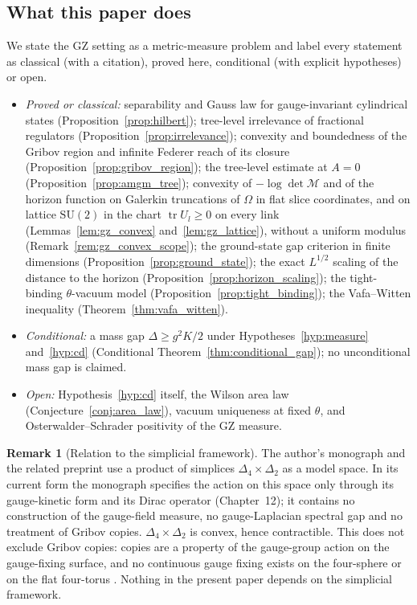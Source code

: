 \documentclass[11pt,a4paper]{amsart}
\theoremstyle{definition}
\newtheorem{remark}[theorem]{Remark}
\begin{document}
\subsection*{What this paper does}
We state the GZ setting as a metric-measure problem and label every statement as classical (with a citation), proved here, conditional (with explicit hypotheses) or open.
\begin{itemize}
    \item \emph{Proved or classical:} separability and Gauss law for gauge-invariant cylindrical states (Proposition~\ref{prop:hilbert}); tree-level irrelevance of fractional regulators (Proposition~\ref{prop:irrelevance}); convexity and boundedness of the Gribov region and infinite Federer reach of its closure (Proposition~\ref{prop:gribov_region}); the tree-level estimate at $A = 0$ (Proposition~\ref{prop:amgm_tree}); convexity of $-\log\det\mathcal{M}$ and of the horizon function on Galerkin truncations of $\Omega$ in flat slice coordinates, and on lattice $\mathrm{SU}(2)$ in the chart $\operatorname{tr}U_l \ge 0$ on every link (Lemmas~\ref{lem:gz_convex} and~\ref{lem:gz_lattice}), without a uniform modulus (Remark~\ref{rem:gz_convex_scope}); the ground-state gap criterion in finite dimensions (Proposition~\ref{prop:ground_state}); the exact $L^{1/2}$ scaling of the distance to the horizon (Proposition~\ref{prop:horizon_scaling}); the tight-binding $\theta$-vacuum model (Proposition~\ref{prop:tight_binding}); the Vafa--Witten inequality (Theorem~\ref{thm:vafa_witten}).
    \item \emph{Conditional:} a mass gap $\Delta \ge g^2 K/2$ under Hypotheses~\ref{hyp:measure} and~\ref{hyp:cd} (Conditional Theorem~\ref{thm:conditional_gap}); no unconditional mass gap is claimed.
    \item \emph{Open:} Hypothesis~\ref{hyp:cd} itself, the Wilson area law (Conjecture~\ref{conj:area_law}), vacuum uniqueness at fixed $\theta$, and Osterwalder--Schrader positivity of the GZ measure.
\end{itemize}

\begin{remark}[Relation to the simplicial framework]
\label{rem:simplicial}
The author's monograph \cite{silvafilho2026book} and the related preprint \cite{silvafilho2026master} use a product of simplices $\Delta_4 \times \Delta_2$ as a model space. In its current form the monograph specifies the action on this space only through its gauge-kinetic form and its Dirac operator (Chapter~12); it contains no construction of the gauge-field measure, no gauge-Laplacian spectral gap and no treatment of Gribov copies. $\Delta_4\times\Delta_2$ is convex, hence contractible. This does not exclude Gribov copies: copies are a property of the gauge-group action on the gauge-fixing surface, and no continuous gauge fixing exists on the four-sphere \cite{singer1978some} or on the flat four-torus \cite{killingback1984gribov}. Nothing in the present paper depends on the simplicial framework.
\end{remark}
\end{document}
